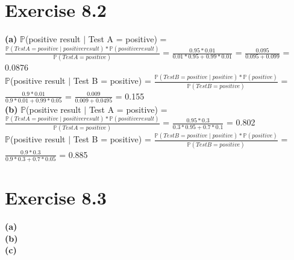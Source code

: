 \documentclass[12pt]{article}
\begin{document}
\section*{Exercise 8.2}

\textbf{(a)} $\mathbb{P}$(positive result $\mid$ Test A = positive) = $\frac{\mathbb{P}(Test A = positive  \mid positive result) * \mathbb{P}(positive result)}{\mathbb{P}(Test A = positive)}$ = $\frac{0.95*0.01}{0.01*0.95 + 0.99*0.01}$ = $\frac{0.095}{0.095+0.099}$ = 0.0876\\
$\mathbb{P}$(positive result $\mid$ Test B = positive) = $\frac{\mathbb{P}(Test B = positive \mid positive)* \mathbb{P}(positive)}{\mathbb{P}(Test B = positive)}$ = $\frac{0.9*0.01}{0.9*0.01+0.99*0.05}$ = $\frac{0.009}{0.009+0.0495}$ = 0.155\\
\textbf{(b)} $\mathbb{P}$(positive result $\mid$ Test A = positive) = $\frac{\mathbb{P}(Test A = positive  \mid positive result) * \mathbb{P}(positive result)}{\mathbb{P}(Test A = positive)}$ = $\frac{0.95*0.3}{0.3*0.95 + 0.7*0.1}$ = 0.802\\
$\mathbb{P}$(positive result $\mid$ Test B = positive) = $\frac{\mathbb{P}(Test B = positive \mid positive)* \mathbb{P}(positive)}{\mathbb{P}(Test B = positive)}$ = $\frac{0.9*0.3}{0.9*0.3+0.7*0.05}$ = 0.885\\

\section*{Exercise 8.3}

\textbf{(a)}\\
\textbf{(b)}\\
\textbf{(c)}
\end{document}
